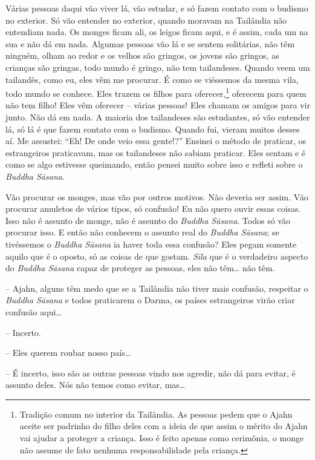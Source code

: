 Várias pessoas daqui vão viver lá, vão estudar, e só fazem contato
com o budismo no exterior. Só vão entender no exterior, quando moravam
na Tailândia não entendiam nada. Os monges ficam ali, os leigos ficam
aqui, e é assim, cada um na sua e não dá em nada. Algumas pessoas vão
lá e se sentem solitárias, não têm ninguém, olham ao redor e os velhos
são gringos, os jovens são gringos, as crianças são gringas, todo mundo
é gringo, não tem tailandeses. Quando veem um tailandês, como eu, eles
vêm me procurar. É como se viéssemos da mesma vila, todo mundo se
conhece. Eles trazem os filhos para oferecer,\footnote{Tradição comum no
interior da Tailândia. As pessoas pedem que o Ajahn aceite ser padrinho
do filho deles com a ideia de que assim o mérito do Ajahn vai ajudar a
proteger a criança. Isso é feito apenas como cerimônia, o monge não
assume de fato nenhuma responsabilidade pela criança.} oferecem para
quem não tem filho! Eles vêm oferecer – várias pessoas! Eles chamam os
amigos para vir junto. Não dá em nada. A maioria dos tailandeses são
estudantes, só vão entender lá, só lá é que fazem contato com o
budismo. Quando fui, vieram muitos desses aí. Me assustei: “Eh! De onde
veio essa gente!?” Ensinei o método de praticar, os estrangeiros
praticavam, mas os tailandeses não sabiam praticar. Eles sentam e é
como se algo estivesse queimando, então pensei muito sobre isso e
refleti sobre o \emph{Buddha Sāsana}. 

Vão procurar os monges, mas vão por outros motivos. Não deveria ser
assim. Vão procurar amuletos de vários tipos, só confusão! Eu não quero
ouvir essas coisas. Isso não é assunto de monge, não é assunto do
\emph{Buddha Sāsana}. Todos só vão procurar isso. E então não
conhecem o assunto real do \emph{Buddha Sāsana}; se tivéssemos o
\emph{Buddha Sāsana} ia haver toda essa confusão? Eles pegam
somente aquilo que é o oposto, só as coisas de que gostam.
\emph{Sīla} que é o verdadeiro aspecto do \emph{Buddha Sāsana}
capaz de proteger as pessoas, eles não têm\ldots{} não têm. 

-- Ajahn, alguns têm medo que se a Tailândia não tiver mais
confusão, respeitar o \emph{Buddha Sāsana} e todos praticarem o
Darma, os países estrangeiros virão criar confusão aqui\ldots{}

-- Incerto.

-- Eles querem roubar nosso país\ldots{}

-- É incerto, isso são as outras pessoas vindo nos agredir, não dá
para evitar, é assunto deles. Nós não temos como evitar, mas\ldots{}

